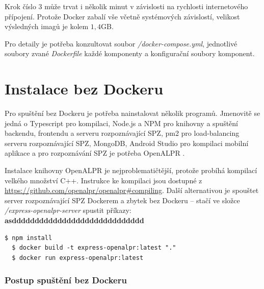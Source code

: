 Krok číslo 3 může trvat i několik minut v závislosti na rychlosti internetového
přípojení. Protože Docker zabalí vše včetně systémových závislostí, velikost
výsledných imagů je kolem $1,4$GB.

Pro detaily je potřeba konzultovat soubor \textit{/docker-compose.yml}, jednotlivé soubory
zvané \textit{Dockerfile} každé komponenty a konfigurační soubory komponent.

\section{Instalace bez Dockeru}

\noindent
Pro spuštění bez Dockeru je potřeba nainstalovat několik programů. Jmenovitě se
jedná o Typescript pro kompilaci, Node.js a NPM pro knihovny a spuštění backendu, frontendu
a serveru rozpoznávající SPZ, pm2 pro load-balancing serveru rozpoznávající SPZ, MongoDB,
Android Studio pro kompilaci mobilní aplikace a pro rozpoznávání SPZ je potřeba OpenALPR .

Instalace knihovny OpenALPR je nejproblematičtější, protože
probíhá kompilací velkého množství C++. Instrukce ke kompilaci
jsou dostupné z \url{https://github.com/openalpr/openalpr#compiling}. Další alternativou je spouštet server rozpoznávající SPZ
Dockerem a zbytek bez Dockeru -- stačí ve složce \textit{/express-openalpr-server} spustit příkazy: \textbf{asddddddddddddddddddddddddddddd}

\begin{lstlisting}[numbers=none]
  $ npm install
  $ docker build -t express-openalpr:latest "."
  $ docker run express-openalpr:latest 
\end{lstlisting}

\subsubsection*{Postup spuštění bez Dockeru}

